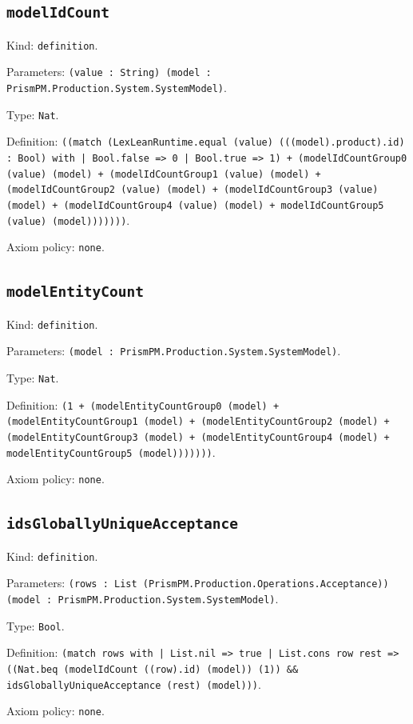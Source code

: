 \documentclass[11pt]{article}
\begin{document}
\subsection*{\texttt{modelIdCount}}
\noindent Kind: \texttt{definition}.\par
\noindent Parameters: \texttt{(value : String) (model : PrismPM.Production.System.SystemModel)}.\par
\noindent Type: \texttt{Nat}.\par
\noindent Definition: \texttt{((match (LexLeanRuntime.equal (value) (((model).product).id) : Bool) with | Bool.false => 0 | Bool.true => 1) + (modelIdCountGroup0 (value) (model) + (modelIdCountGroup1 (value) (model) + (modelIdCountGroup2 (value) (model) + (modelIdCountGroup3 (value) (model) + (modelIdCountGroup4 (value) (model) + modelIdCountGroup5 (value) (model)))))))}.\par
\noindent Axiom policy: \texttt{none}.\par
\subsection*{\texttt{modelEntityCount}}
\noindent Kind: \texttt{definition}.\par
\noindent Parameters: \texttt{(model : PrismPM.Production.System.SystemModel)}.\par
\noindent Type: \texttt{Nat}.\par
\noindent Definition: \texttt{(1 + (modelEntityCountGroup0 (model) + (modelEntityCountGroup1 (model) + (modelEntityCountGroup2 (model) + (modelEntityCountGroup3 (model) + (modelEntityCountGroup4 (model) + modelEntityCountGroup5 (model)))))))}.\par
\noindent Axiom policy: \texttt{none}.\par
\subsection*{\texttt{idsGloballyUniqueAcceptance}}
\noindent Kind: \texttt{definition}.\par
\noindent Parameters: \texttt{(rows : List (PrismPM.Production.Operations.Acceptance)) (model : PrismPM.Production.System.SystemModel)}.\par
\noindent Type: \texttt{Bool}.\par
\noindent Definition: \texttt{(match rows with | List.nil => true | List.cons row rest => ((Nat.beq (modelIdCount ((row).id) (model)) (1)) \&\& idsGloballyUniqueAcceptance (rest) (model)))}.\par
\noindent Axiom policy: \texttt{none}.\par
\end{document}
